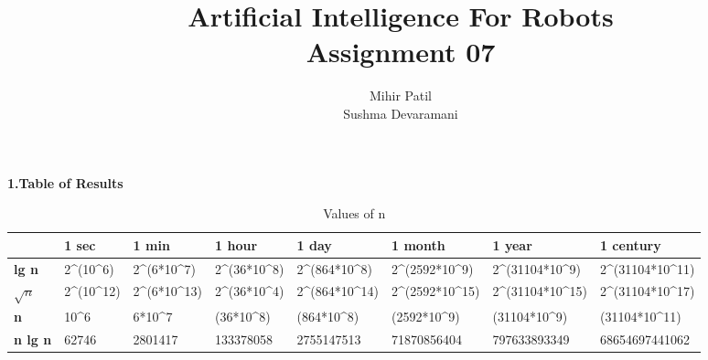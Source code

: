 \documentclass[11pt,a4paper]{article}
\author{Mihir Patil \\ Sushma Devaramani}
\title{Artificial Intelligence For Robots \\ Assignment 07}
\begin{document}
\begin{titlepage}
\maketitle
\end{titlepage}
\newpage

\begin{center}
\textbf{1.{Table of Results}}\\
\end{center}

\begin{center}
\begin{table}[h]
\centering
\caption{Values of n}
\label{Values of n}
\begin{tabular}{|l|l|l|l|l|l|l|l|}
\hline
                             & \textbf{1 sec}                            & \textbf{1 min}                              & \textbf{1 hour}                             & \textbf{1 day}                                & \textbf{1 month}                               & \textbf{1 year}                                 & \textbf{1 century}                              \\ \hline
\textbf{lg n}                & 2\textasciicircum (10\textasciicircum 6)  & 2\textasciicircum (6*10\textasciicircum 7)  & 2\textasciicircum (36*10\textasciicircum 8) & 2\textasciicircum (864*10\textasciicircum 8)  & 2\textasciicircum (2592*10\textasciicircum 9)  & 2\textasciicircum (31104*10\textasciicircum 9)  & 2\textasciicircum (31104*10\textasciicircum 11) \\ \hline
\textbf{$\sqrt{n}$}             & 2\textasciicircum (10\textasciicircum 12) & 2\textasciicircum (6*10\textasciicircum 13) & 2\textasciicircum (36*10\textasciicircum 4) & 2\textasciicircum (864*10\textasciicircum 14) & 2\textasciicircum (2592*10\textasciicircum 15) & 2\textasciicircum (31104*10\textasciicircum 15) & 2\textasciicircum (31104*10\textasciicircum 17) \\ \hline
\textbf{n}                   & 10\textasciicircum 6                      & 6*10\textasciicircum 7                      & (36*10\textasciicircum 8)                   & (864*10\textasciicircum 8)                    & (2592*10\textasciicircum 9)                    & (31104*10\textasciicircum 9)                    & (31104*10\textasciicircum 11)                   \\ \hline
\textbf{n lg n}              & 62746                                          &                                     2801417   &         133378058                                    &                                              2755147513 &                     71870856404                           &                                                797633893349 &              68654697441062                                   \\ \hline

\end{tabular}
\end{table}
\end{center}
\end{document}

